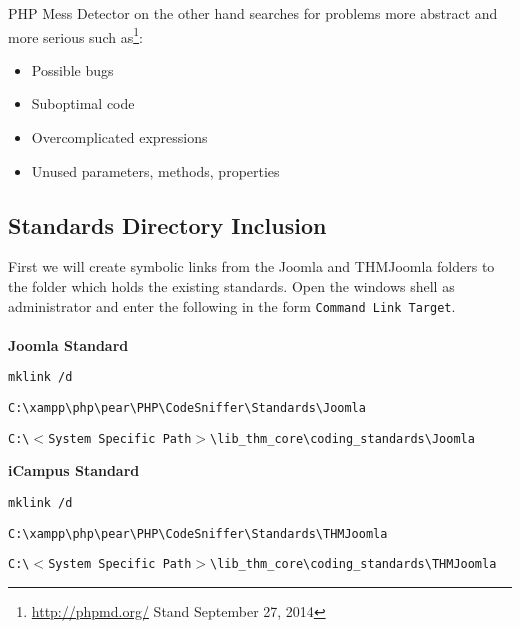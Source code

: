 \noindent
PHP Mess Detector on the other hand searches for problems more abstract and more serious such as\footnote{\url{http://phpmd.org/} Stand September 27, 2014}:

\begin{itemize}
	\item Possible bugs
	\item Suboptimal code
	\item Overcomplicated expressions
	\item Unused parameters, methods, properties
\end{itemize}

\newpage

\subsection{Standards Directory Inclusion}

First we will create symbolic links from the Joomla and THMJoomla folders to the folder which holds the existing standards. Open the windows shell as administrator and enter the following in the form \texttt{Command Link Target}.\\
\\
\textbf{Joomla Standard}
\begin{description}
	\itemsep-10pt
	\item[Command] \texttt{mklink /d}\\
	\item[Link] \texttt{C:\textbackslash xampp\textbackslash php\textbackslash pear\textbackslash PHP\textbackslash CodeSniffer\textbackslash Standards\textbackslash Joomla}\\
	\item[Target] \texttt{C:\textbackslash $<$System Specific Path$>$\textbackslash lib\_thm\_core\textbackslash coding\_standards\textbackslash Joomla}\\
\end{description}

\noindent
\textbf{iCampus Standard}
\begin{description}
	\itemsep-10pt
	\item[Command] \texttt{mklink /d}\\
	\item[Link] \texttt{C:\textbackslash xampp\textbackslash php\textbackslash pear\textbackslash PHP\textbackslash CodeSniffer\textbackslash Standards\textbackslash THMJoomla}\\
	\item[Target] \texttt{C:\textbackslash $<$System Specific Path$>$\textbackslash lib\_thm\_core\textbackslash coding\_standards\textbackslash THMJoomla}\\
\end{description}

